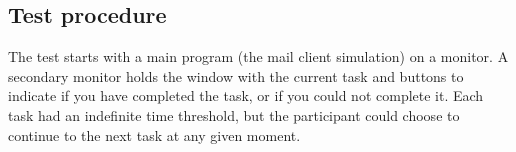 \subsection{Test procedure}
The test starts with a main program (the mail client simulation) on a monitor. 
A secondary monitor holds the window with the current task and buttons to indicate if you have completed the task, or if you could not complete it. 
Each task had an indefinite time threshold, but the participant could choose to continue to the next task at any given moment. 
